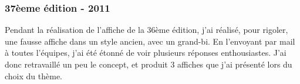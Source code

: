         \subsubsection{37èeme édition - 2011}            
            
            \begin{center}        
                Pendant la réalisation de l'affiche de la 36ème édition, j'ai réalisé, pour rigoler, une fausse affiche dans un style ancien, avec un grand-bi. En l'envoyant par mail à toutes l'équipes, j'ai été étonné de voir plusieurs réponses enthousiastes.
                J'ai donc retravaillé un peu le concept, et produit 3 affiches que j'ai présenté lors du choix du thème.
            \end{center}
            
